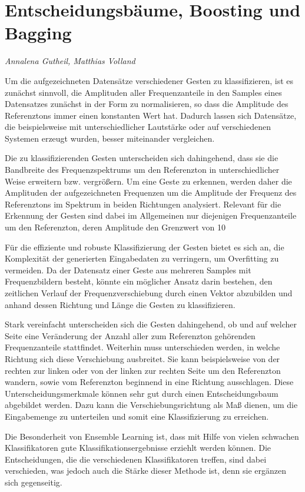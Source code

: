 \section{Entscheidungsbäume, Boosting und Bagging}
\textit{Annalena Gutheil, Matthias Volland}


Um die aufgezeichneten Datensätze verschiedener Gesten zu klassifizieren, ist es zunächst sinnvoll, die Amplituden aller Frequenzanteile in den Samples eines Datensatzes zunächst in der Form zu normalisieren, so dass die Amplitude des Referenztons immer einen konstanten Wert hat. Dadurch lassen sich Datensätze, die beispielsweise mit unterschiedlicher Lautstärke oder auf verschiedenen Systemen erzeugt wurden, besser miteinander vergleichen.

Die zu klassifizierenden Gesten unterscheiden sich dahingehend, dass sie die Bandbreite des Frequenzspektrums um den Referenzton in unterschiedlicher Weise erweitern bzw. vergrößern. Um eine Geste zu erkennen, werden daher die Amplituden der aufgezeichneten Frequenzen um die Amplitude der Frequenz des Referenztons im Spektrum in beiden Richtungen analysiert. Relevant für die Erkennung der Gesten sind dabei im Allgemeinen nur diejenigen Frequenzanteile um den Referenzton, deren Amplitude den Grenzwert von 10%

Für die effiziente und robuste Klassifizierung der Gesten bietet es sich an, die Komplexität der generierten Eingabedaten zu verringern, um Overfitting zu vermeiden. Da der Datensatz einer Geste aus mehreren Samples mit Frequenzbildern besteht, könnte ein möglicher Ansatz darin bestehen, den zeitlichen Verlauf der Frequenzverschiebung durch einen Vektor abzubilden und anhand dessen Richtung und Länge die Gesten zu klassifizieren.

Stark vereinfacht unterscheiden sich die Gesten dahingehend, ob und auf welcher Seite eine Veränderung der Anzahl aller zum Referenzton gehörenden Frequenzanteile stattfindet. Weiterhin muss unterschieden werden, in welche Richtung sich diese Verschiebung ausbreitet. Sie kann beispielsweise von der rechten zur linken oder von der linken zur rechten Seite um den Referenzton wandern, sowie vom Referenzton beginnend in eine Richtung ausschlagen. Diese Unterscheidungsmerkmale können sehr gut durch einen Entscheidungsbaum abgebildet werden. Dazu kann die Verschiebungsrichtung als Maß dienen, um die Eingabemenge zu unterteilen und somit eine Klassifizierung zu erreichen.

Die Besonderheit von Ensemble Learning ist, dass mit Hilfe von vielen schwachen Klassifikatoren gute Klassifikationsergebnisse erziehlt werden können. Die Entscheidungen, die die verschiedenen Klassifikatoren treffen, sind dabei verschieden, was jedoch auch die Stärke dieser Methode ist, denn sie ergänzen sich gegenseitig.
